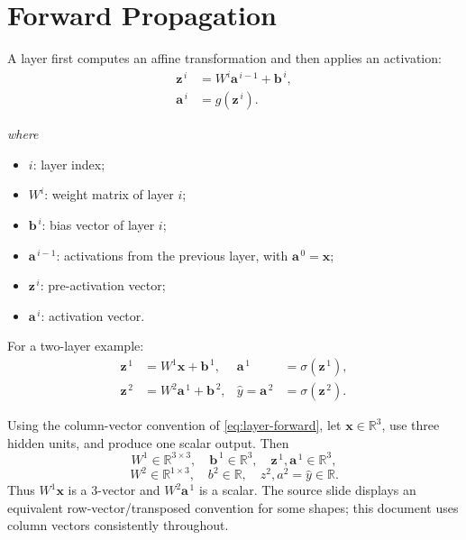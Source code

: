 \documentclass[11pt,a4paper]{report}
\newcommand{\vect}[1]{\bm{#1}}
\newcommand{\R}{\mathbb{R}}
\newcommand{\wherelegend}{\par\smallskip\textit{where}\vspace{-0.3em}}
\begin{document}
\section{Forward Propagation}

A layer first computes an affine transformation and then applies an activation:
\begin{align}
  \vect{z}^{\,i} &= W^i\vect{a}^{\,i-1}+\vect{b}^{\,i},\\
  \vect{a}^{\,i} &= g\!\left(\vect{z}^{\,i}\right).
  \label{eq:layer-forward}
\end{align}
\wherelegend
\begin{itemize}
  \item $i$: layer index;
  \item $W^i$: weight matrix of layer $i$;
  \item $\vect{b}^{\,i}$: bias vector of layer $i$;
  \item $\vect{a}^{\,i-1}$: activations from the previous layer, with $\vect{a}^{\,0}=\vect{x}$;
  \item $\vect{z}^{\,i}$: pre-activation vector;
  \item $\vect{a}^{\,i}$: activation vector.
\end{itemize}

For a two-layer example:
\begin{align}
  \vect{z}^{\,1} &= W^1\vect{x}+\vect{b}^{\,1}, & \vect{a}^{\,1}&=\sigma(\vect{z}^{\,1}),\\
  \vect{z}^{\,2} &= W^2\vect{a}^{\,1}+\vect{b}^{\,2}, & \hat y=\vect{a}^{\,2}&=\sigma(\vect{z}^{\,2}).
  \label{eq:two-layer-forward}
\end{align}

\begin{examplebox}[title={Dimension check for the worked forward pass}]
Using the column-vector convention of \cref{eq:layer-forward}, let $\vect{x}\in\R^3$, use three hidden units, and produce one scalar output. Then
\[
W^1\in\R^{3\times 3},\quad \vect{b}^{\,1}\in\R^3,\quad
\vect{z}^{\,1},\vect{a}^{\,1}\in\R^3,
\]
\[
W^2\in\R^{1\times 3},\quad b^2\in\R,\quad
z^2,a^2=\hat y\in\R.
\]
Thus $W^1\vect{x}$ is a $3$-vector and $W^2\vect{a}^{\,1}$ is a scalar. The source slide displays an equivalent row-vector/transposed convention for some shapes; this document uses column vectors consistently throughout.
\end{examplebox}
\end{document}
